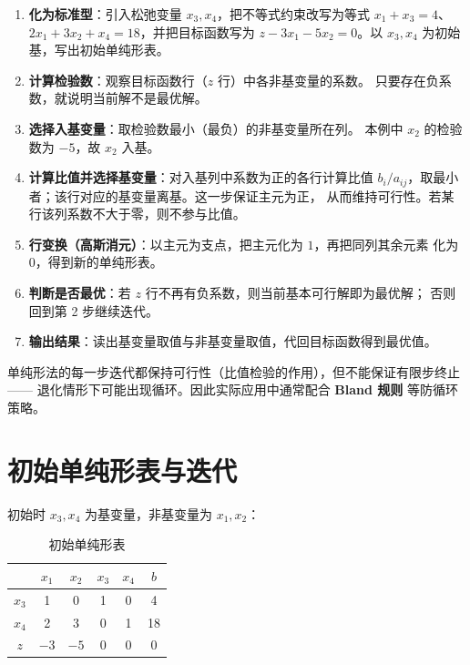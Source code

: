 \begin{enumerate}
  \item \textbf{化为标准型}：引入松弛变量 $x_3, x_4$，把不等式约束改写为等式
    $x_1 + x_3 = 4$、$2x_1 + 3x_2 + x_4 = 18$，并把目标函数写为
    $z - 3x_1 - 5x_2 = 0$。以 $x_3, x_4$ 为初始基，写出初始单纯形表。
  \item \textbf{计算检验数}：观察目标函数行（$z$ 行）中各非基变量的系数。
    只要存在负系数，就说明当前解不是最优解。
  \item \textbf{选择入基变量}：取检验数最小（最负）的非基变量所在列。
    本例中 $x_2$ 的检验数为 $-5$，故 $x_2$ 入基。
  \item \textbf{计算比值并选择基变量}：对入基列中系数为正的各行计算比值
    $b_i / a_{ij}$，取最小者；该行对应的基变量离基。这一步保证主元为正，
    从而维持可行性。若某行该列系数不大于零，则不参与比值。
  \item \textbf{行变换（高斯消元）}：以主元为支点，把主元化为 $1$，再把同列其余元素
    化为 $0$，得到新的单纯形表。
  \item \textbf{判断是否最优}：若 $z$ 行不再有负系数，则当前基本可行解即为最优解；
    否则回到第 2 步继续迭代。
  \item \textbf{输出结果}：读出基变量取值与非基变量取值，代回目标函数得到最优值。
\end{enumerate}

\begin{note}
单纯形法的每一步迭代都保持可行性（比值检验的作用），但不能保证有限步终止——
退化情形下可能出现循环。因此实际应用中通常配合 \textbf{ Bland 规则} 等防循环策略。
\end{note}

\section{初始单纯形表与迭代}

初始时 $x_3, x_4$ 为基变量，非基变量为 $x_1, x_2$：

\begin{table}[htbp]
  \centering
  \caption{初始单纯形表}
  \label{tab:simplex-0}
  \begin{tabular}{c|ccccc}
    \toprule
    & $x_1$ & $x_2$ & $x_3$ & $x_4$ & $b$ \\
    \midrule
    $x_3$ & 1 & 0 & 1 & 0 & 4 \\
    $x_4$ & 2 & 3 & 0 & 1 & 18 \\
    \midrule
    $z$  & $-3$ & $-5$ & 0 & 0 & 0 \\
    \bottomrule
  \end{tabular}
\end{table}

